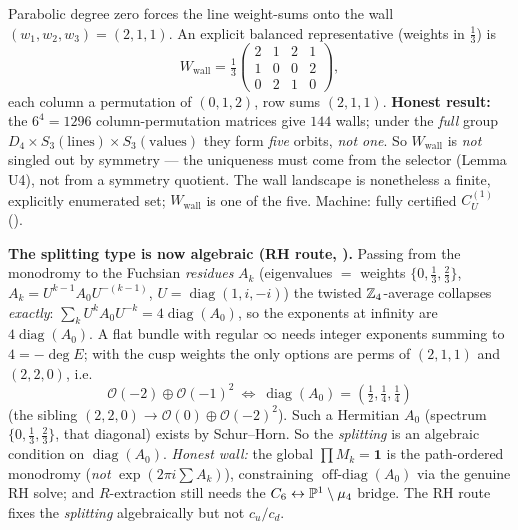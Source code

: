 \begin{lemma}
Parabolic degree zero forces the line weight-sums onto the wall $(w_1,w_2,w_3)=(2,1,1)$. An explicit
balanced representative (weights in $\tfrac13$) is
\[
  W_{\mathrm{wall}}=\tfrac13\begin{pmatrix}2&1&2&1\\1&0&0&2\\0&2&1&0\end{pmatrix},
\]
each column a permutation of $(0,1,2)$, row sums $(2,1,1)$. \textbf{Honest result:}
the $6^4{=}1296$ column-permutation matrices give $144$ walls; under the \emph{full} group
$D_4\times S_3(\text{lines})\times S_3(\text{values})$ they form \emph{five} orbits, \emph{not one}. So
$W_{\mathrm{wall}}$ is \emph{not} singled out by symmetry --- the uniqueness must come from the selector
(Lemma U4), not from a symmetry quotient. The wall landscape is nonetheless a finite, explicitly
enumerated set; $W_{\mathrm{wall}}$ is one of the five. Machine: fully certified $C_U^{(1)}$
().

\smallskip
\noindent\textbf{The splitting type is now algebraic (RH route, ).} Passing from
the monodromy to the Fuchsian \emph{residues} $A_k$ (eigenvalues $=$ weights $\{0,\tfrac13,\tfrac23\}$,
$A_k=U^{k-1}A_0U^{-(k-1)}$, $U=\operatorname{diag}(1,i,-i)$) the twisted $\mathbb Z_4$-average collapses
\emph{exactly}: $\sum_kU^kA_0U^{-k}=4\operatorname{diag}(A_0)$, so the exponents at infinity are
$4\operatorname{diag}(A_0)$. A flat bundle with regular $\infty$ needs integer exponents summing to
$4{=}-\deg E$; with the cusp weights the only options are perms of $(2,1,1)$ and $(2,2,0)$, i.e.
\[
  \boxed{\ \mathcal O(-2)\!\oplus\!\mathcal O(-1)^2\ \Longleftrightarrow\ \operatorname{diag}(A_0)=(\tfrac12,\tfrac14,\tfrac14)\ }
\]
(the sibling $(2,2,0)\to\mathcal O(0)\oplus\mathcal O(-2)^2$). Such a Hermitian $A_0$ (spectrum
$\{0,\tfrac13,\tfrac23\}$, that diagonal) exists by Schur--Horn. So the \emph{splitting} is an algebraic
condition on $\operatorname{diag}(A_0)$. \emph{Honest wall:} the global $\prod M_k=\mathbf1$ is the
path-ordered monodromy (\emph{not} $\exp(2\pi i\sum A_k)$), constraining $\operatorname{off-diag}(A_0)$ via
the genuine RH solve; and $R$-extraction still needs the $C_6\leftrightarrow\mathbb P^1\setminus\mu_4$ bridge. The
RH route fixes the \emph{splitting} algebraically but not $c_u/c_d$.
\end{lemma}

